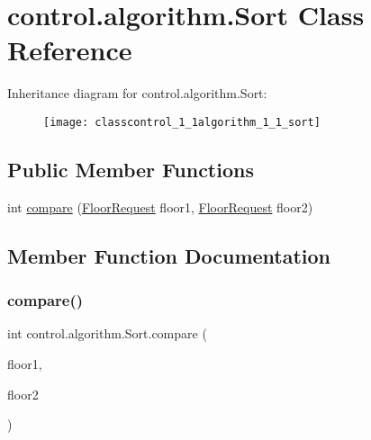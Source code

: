 \hypertarget{classcontrol_1_1algorithm_1_1_sort}{}\section{control.\+algorithm.\+Sort Class Reference}
\label{classcontrol_1_1algorithm_1_1_sort}
Inheritance diagram for control.\+algorithm.\+Sort\+:\begin{figure}[H]
\begin{center}
\leavevmode
\texttt{[image: classcontrol\_1\_1algorithm\_1\_1\_sort]}
\end{center}
\end{figure}
\subsection*{Public Member Functions}
\begin{DoxyCompactItemize}
\item 
int \mbox{\hyperlink{classcontrol_1_1algorithm_1_1_sort_a7b8bfc4d73475992e728addc4cc7c9a4}{compare}} (\mbox{\hyperlink{classcontrol_1_1command_1_1_floor_request}{Floor\+Request}} floor1, \mbox{\hyperlink{classcontrol_1_1command_1_1_floor_request}{Floor\+Request}} floor2)
\end{DoxyCompactItemize}


\subsection{Member Function Documentation}
\mbox{\label{classcontrol_1_1algorithm_1_1_sort_a7b8bfc4d73475992e728addc4cc7c9a4}} 
\subsubsection{\texorpdfstring{compare()}{compare()}}
{\footnotesize\ttfamily int control.\+algorithm.\+Sort.\+compare (\begin{DoxyParamCaption}\item[{\mbox{\hyperlink{classcontrol_1_1command_1_1_floor_request}{Floor\+Request}}}]{floor1,  }\item[{\mbox{\hyperlink{classcontrol_1_1command_1_1_floor_request}{Floor\+Request}}}]{floor2 }\end{DoxyParamCaption})}

